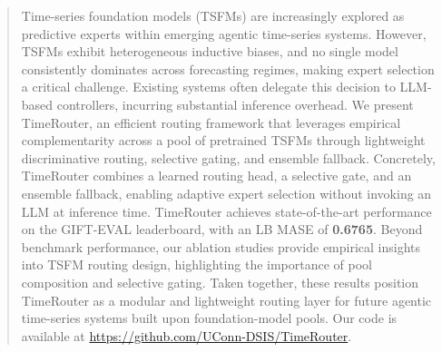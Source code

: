 \documentclass{article}
\theoremstyle{plain}
\theoremstyle{definition}
\theoremstyle{remark}
\begin{document}



\printAffiliationsAndNotice{}
\begin{abstract}
Time-series foundation models (TSFMs) are increasingly explored as predictive experts within emerging agentic time-series systems. However, TSFMs exhibit heterogeneous inductive biases, and no single model consistently dominates across forecasting regimes, making expert selection a critical challenge. Existing systems often delegate this decision to LLM-based controllers, incurring substantial inference overhead. We present TimeRouter, an efficient routing framework that leverages empirical complementarity across a pool of pretrained TSFMs through lightweight discriminative routing, selective gating, and ensemble fallback. Concretely, TimeRouter combines a learned routing head, a selective gate, and an ensemble fallback, enabling adaptive expert selection without invoking an LLM at inference time. TimeRouter achieves state-of-the-art performance on the GIFT-EVAL leaderboard, with an LB MASE of \textbf{0.6765}. Beyond benchmark performance, our ablation studies provide empirical insights into TSFM routing design, highlighting the importance of pool composition and selective gating. Taken together, these results position TimeRouter as a modular and lightweight routing layer for future agentic time-series systems built upon foundation-model pools. Our code is available at \url{https://github.com/UConn-DSIS/TimeRouter}.
\end{abstract}
\end{document}
